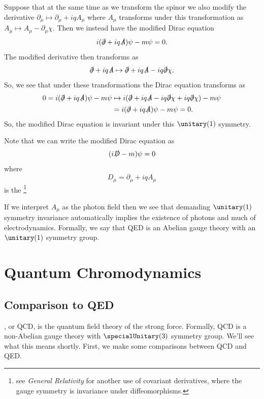 \documentclass[fleqn]{NotesClass}
\newcommand{\course}[1]{\textit{#1}}
\begin{document}
    Suppose that at the same time as we transform the spinor we also modify the derivative \(\partial_\mu \mapsto \partial_\mu + iq A_\mu\) where \(A_\mu\) transforms under this transformation as \(A_\mu \mapsto A_\mu - \partial_\mu \chi\).
    Then we instead have the modified Dirac equation
    \begin{equation}
        i(\slashed{\partial} + iq\slashed{A})\psi - m\psi = 0.
    \end{equation}
    The modified derivative then transforms as
    \begin{equation}
        \slashed{\partial} + iq\slashed{A} \mapsto \slashed{\partial} + iq\slashed{A} - iq\slashed{\partial}\chi.
    \end{equation}
    So, we see that under these transformations the Dirac equation transforms as
    \begin{align}
        0 = i(\slashed{\partial} + iq\slashed{A})\psi - m\psi &\mapsto i(\slashed{\partial} + iq\slashed{A} - iq\slashed{\partial}\chi + iq\slashed{\partial}\chi) - m\psi\\
        &= i(\slashed{\partial} + iq\slashed{A})\psi - m\psi = 0.
    \end{align}
    So, the modified Dirac equation is invariant under this \(\unitary(1)\) symmetry.
    
    Note that we can write the modified Dirac equation as
    \begin{equation}
        (i\slashed{D} - m)\psi = 0
    \end{equation}
    where
    \begin{equation}
        D_\mu = \partial_\mu + iqA_\mu
    \end{equation}
    is the \footnote{see \course{General Relativity} for another use of covariant derivatives, where the gauge symmetry is invariance under diffeomorphisms.}
    
    If we interpret \(A_\mu\) as the photon field then we see that demanding \(\unitary(1)\) symmetry invariance automatically implies the existence of photons and much of electrodynamics.
    Formally, we say that QED is an Abelian gauge theory with an \(\unitary(1)\) symmetry group.
    
    \chapter{Quantum Chromodynamics}
    \section{Comparison to QED}
    , or QCD, is the quantum field theory of the strong force.
    Formally, QCD is a non-Abelian gauge theory with \(\specialUnitary(3)\) symmetry group.
    We'll see what this means shortly.
    First, we make some comparisons between QCD and QED.
    
\end{document}
